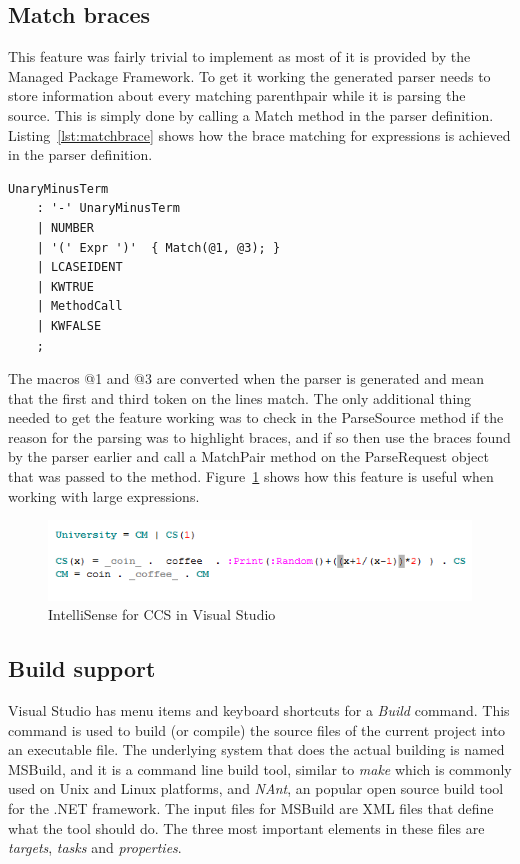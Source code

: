 	\subsection{Match braces}
	
	This feature was fairly trivial to implement as most of it is provided by 
	the Managed Package Framework. To get it working the generated parser needs 
	to store information about every matching parenthpair while it is parsing 
	the source. This is simply done by calling a \textsf{Match} method in the 
	parser definition. Listing~\ref{lst:matchbrace} shows how the brace matching 
	for expressions is achieved in the parser definition.

\begin{lstlisting}[caption=Matching braces for expressions, label=lst:matchbrace]	
UnaryMinusTerm
    : '-' UnaryMinusTerm
    | NUMBER
    | '(' Expr ')'  { Match(@1, @3); }
    | LCASEIDENT
    | KWTRUE
    | MethodCall
    | KWFALSE
    ;
\end{lstlisting}

	The macros @1 and @3 are converted when the parser is generated and mean 
	that the first and third token on the lines match. The only additional thing 
	needed to get the feature working was to check in the \textsf{ParseSource} 
	method if the reason for the parsing was to highlight braces, and if so then 
	use the braces found by the parser earlier and call a \textsf{MatchPair} 
	method on the \textsf{ParseRequest} object that was passed to the method. 
	Figure~\ref{fig:matchbraces} shows how this feature is useful when working 
	with large expressions.
	
	\begin{figure}[h!]
		\centering
		\includegraphics[scale=0.75]{matchbraces.png}
		\caption{IntelliSense for CCS in Visual Studio}
		\label{fig:matchbraces}
	\end{figure}
		
	
	\subsection{Build support}\label{msbuild}
	
	Visual Studio has menu items and keyboard shortcuts for a \textit{Build} 
	command. This command is used to build (or compile) the source files of the 
	current project into an executable file. The underlying system that does the 
	actual building is named MSBuild, and it is a command line build tool, 
	similar to \textit{make} which is commonly used on Unix and Linux platforms, 
	and \textit{NAnt}, an popular open source build tool for the .NET framework. 
	The input files for MSBuild are XML files that define what the tool should 
	do. The three most important elements in these files are \textit{targets}, 
	\textit{tasks} and \textit{properties}. 
	
